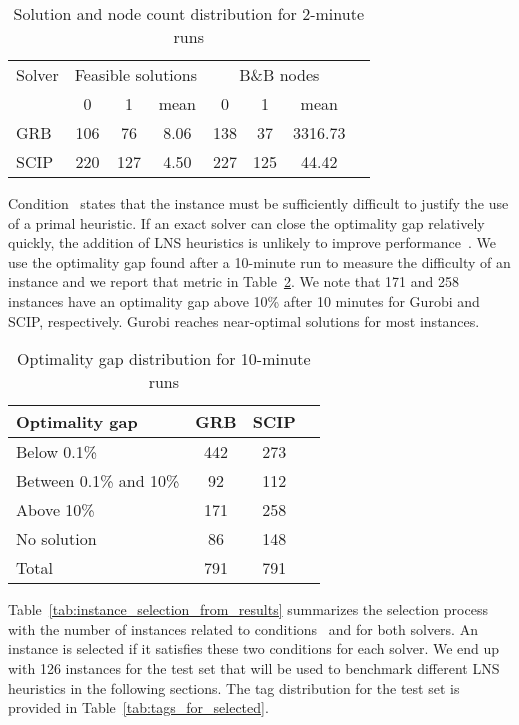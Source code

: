 \documentclass[3p, authoryear, times]{elsarticle}
\begin{document}
\begin{table}[h]
\centering
\caption{Solution and node count distribution for 2-minute runs}
\label{tab:sol_node_count_distribution}
\begin{tabular}{lccccccc}
\toprule
{Solver} & \multicolumn{3}{c}{Feasible solutions} & \multicolumn{3}{c}{B\&B nodes} \\
{} & {0} & {1} & {mean} & {0} & {1} & {mean} \\
\midrule
GRB & 106 & 76 & 8.06 & 138 & 37 & 3316.73 \\
SCIP & 220 & 127 & 4.50 & 227 & 125 & 44.42 \\
\bottomrule
\end{tabular}
\end{table}




 Condition~ states that the instance must be sufficiently difficult to justify the use of a primal heuristic. If an exact solver can close the optimality gap relatively quickly, the addition of LNS heuristics is unlikely to improve performance~\citep{chmiela_online_2023}.  We use the optimality gap found after a 10-minute run to measure the difficulty of an instance and we report that metric in Table~\ref{tab:optimality_gap_distribution}.   We note that 171 and 258 instances have an optimality gap above 10\% after 10 minutes for Gurobi and SCIP, respectively. Gurobi reaches near-optimal solutions for most instances.

\begin{table}[h]
\centering
\caption{Optimality gap distribution for 10-minute runs}
\label{tab:optimality_gap_distribution}
\begin{tabular}{lccc}
\toprule
{Optimality gap} & {GRB} & {SCIP} \\
\midrule
Below 0.1\% & 442 & 273 \\
Between 0.1\% and 10\% & 92 & 112 \\
Above 10\% & 171 & 258 \\
No solution & 86 & 148 \\
Total & 791 & 791 \\
\bottomrule
\end{tabular}
\end{table}




Table~\ref{tab:instance_selection_from_results} summarizes the selection process with the number of instances related to conditions~ and  for both solvers. An instance is selected if it satisfies these two conditions for each solver. We end up with 126 instances for the test set that will be used to benchmark different LNS heuristics in the following sections. The tag distribution for the test set is provided in Table~\ref{tab:tags_for_selected}. 
\end{document}
